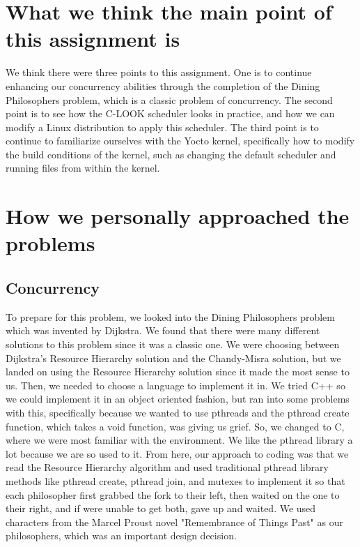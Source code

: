 \documentclass[letterpaper,10pt,titlepage]{article}
\begin{document}
\section{What we think the main point of this assignment is}
We think there were three points to this assignment. One is to continue enhancing our concurrency abilities through the completion of the Dining Philosophers problem, which is a classic problem of concurrency. The second point is to see how the C-LOOK scheduler looks in practice, and how we can modify a Linux distribution to apply this scheduler. The third point is to continue to familiarize ourselves with the Yocto kernel, specifically how to modify the build conditions of the kernel, such as changing the default scheduler and running files from within the kernel.

\section{How we personally approached the problems}
\subsection{Concurrency}
To prepare for this problem, we looked into the Dining Philosophers problem which was invented by Dijkstra. We found that there were many different solutions to this problem since it was a classic one. We were choosing between Dijkstra's Resource Hierarchy solution and the Chandy-Misra solution, but we landed on using the Resource Hierarchy solution since it made the most sense to us. Then, we needed to choose a language to implement it in. We tried C++ so we could implement it in an object oriented fashion, but ran into some problems with this, specifically because we wanted to use pthreads and the pthread create function, which takes a void function, was giving us grief. So, we changed to C, where we were most familiar with the environment. We like the pthread library a lot because we are so used to it. From here, our approach to coding was that we read the Resource Hierarchy algorithm and used traditional pthread library methods like pthread create, pthread join, and mutexes to implement it so that each philosopher first grabbed the fork to their left, then waited on the one to their right, and if were unable to get both, gave up and waited. We used characters from the Marcel Proust novel "Remembrance of Things Past" as our philosophers, which was an important design decision.
\end{document}
